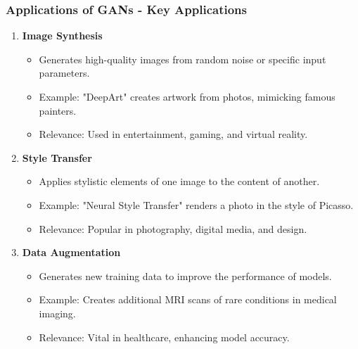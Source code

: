 \documentclass[aspectratio=169]{beamer}
\begin{document}
\begin{frame}[fragile]
    \frametitle{Applications of GANs - Key Applications}
    \begin{enumerate}
        \item \textbf{Image Synthesis}
        \begin{itemize}
            \item Generates high-quality images from random noise or specific input parameters.
            \item Example: "DeepArt" creates artwork from photos, mimicking famous painters.
            \item Relevance: Used in entertainment, gaming, and virtual reality.
        \end{itemize}
        
        \item \textbf{Style Transfer}
        \begin{itemize}
            \item Applies stylistic elements of one image to the content of another.
            \item Example: "Neural Style Transfer" renders a photo in the style of Picasso.
            \item Relevance: Popular in photography, digital media, and design.
        \end{itemize}

        \item \textbf{Data Augmentation}
        \begin{itemize}
            \item Generates new training data to improve the performance of models.
            \item Example: Creates additional MRI scans of rare conditions in medical imaging.
            \item Relevance: Vital in healthcare, enhancing model accuracy.
        \end{itemize}
    \end{enumerate}
\end{frame}
\end{document}
